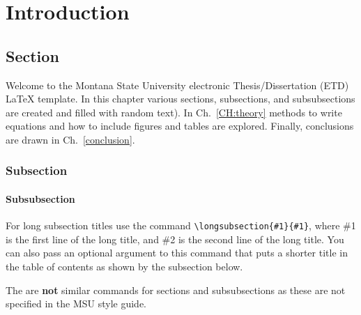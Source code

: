 \chapter{Introduction}\label{CH:introduction}


\section{Section}\label{Sect:test}
Welcome to the Montana State University electronic Thesis/Dissertation (ETD) \LaTeX{} template.  In this chapter various sections, subsections, and subsubsections are created and filled with random text).  In Ch.~\ref{CH:theory} methods to write equations and how to include figures and tables are explored.  Finally, conclusions are drawn in Ch.~\ref{conclusion}.

\subsection{Subsection}\label{Sect:testsub}
\lipsum[2] %

\subsubsection{Subsubsection}\label{Sect:testsubsub}
\lipsum[3] %

\label{Sect:longsub}
For long subsection titles use the command \verb|\longsubsection{#1}{#1}|, where \#1 is the first line of the long title, and \#2 is the second line of the long title. You can also pass an optional argument to this command that puts a shorter title in the table of contents as shown by the subsection below.

\label{Sect:longsub}
The are \textbf{not} similar commands for sections and subsubsections as these are not specified in the MSU style guide.  


